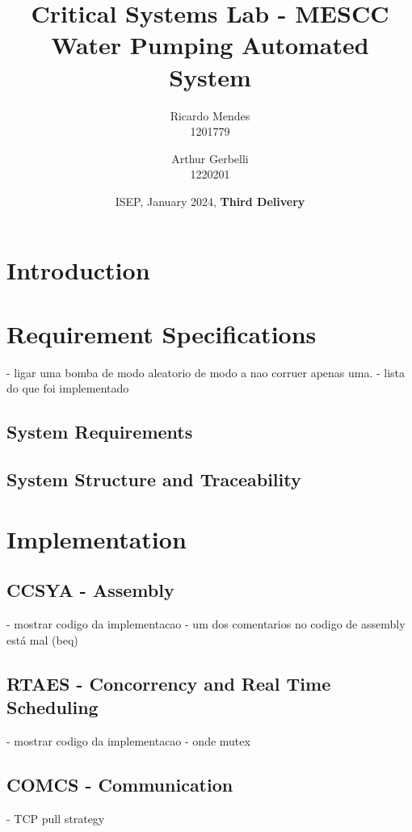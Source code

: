 \documentclass[11pt]{article}
\title{\textbf{Critical Systems Lab - MESCC\\ Water Pumping Automated System}}
\date{ISEP, January 2024, \textbf{Third Delivery}}
\author{Ricardo Mendes\\ 1201779
\and Arthur Gerbelli\\ 1220201}
\begin{document}
\maketitle              
\newpage
\tableofcontents
\newpage

%
\section{Introduction}


\section{Requirement Specifications}

- ligar uma bomba de modo aleatorio de modo a nao corruer apenas uma.
- lista do que foi implementado

\subsection{System Requirements}

\subsection{System Structure and Traceability}


\newpage
\section{Implementation}

\subsection{CCSYA - Assembly}

- mostrar codigo da implementacao
- um dos comentarios no codigo de assembly está mal (beq)

\subsection{RTAES - Concorrency and Real Time Scheduling}

- mostrar codigo da implementacao
- onde mutex

\subsection{COMCS - Communication}

- TCP pull strategy
\end{document}
